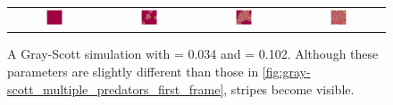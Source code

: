 \begin{figure}[h]
\centering
\mySfFamily
\begin{tabular}{c c c c}
\includegraphics[width = 0.19\textwidth]{../images/f038_k102_multi_Moment_1} & \includegraphics[width = 0.19\textwidth]{../images/f038_k102_multi_Moment_2} & \includegraphics[width = 0.19\textwidth]{../images/f038_k102_multi_Moment_3} & \includegraphics[width = 0.19\textwidth]{../images/f038_k102_multi_Moment_4}
\end{tabular}
\caption{A Gray-Scott simulation with  = 0.034 and  = 0.102. Although these parameters are slightly different than those in \autoref{fig:gray-scott_multiple_predators_first_frame}, stripes become visible.}
\label{fig:gray-scott_f38_k102_first_frame}
\end{figure}

